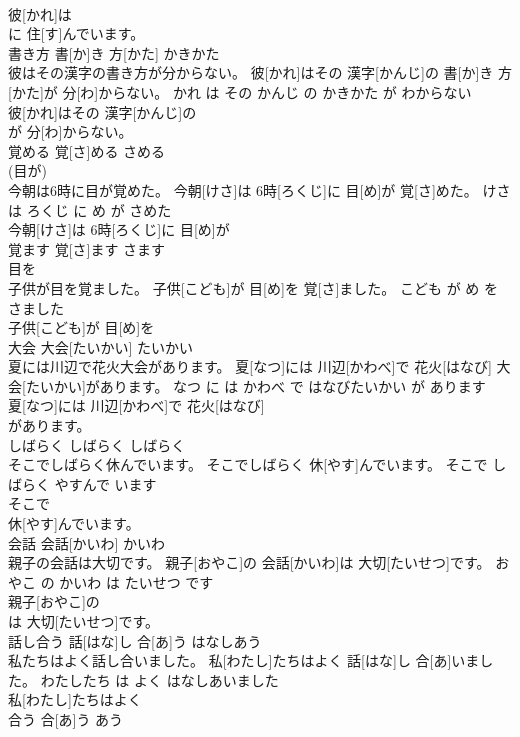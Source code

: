 \documentclass[8pt]{extreport}
\begin{document}
\begin{CJK}{UTF8}{min}
\\	彼[かれ]は
\\	に 住[す]んでいます。		
\\	書き方	書[か]き 方[かた]	かきかた	
\\	彼はその漢字の書き方が分からない。	彼[かれ]はその 漢字[かんじ]の 書[か]き 方[かた]が 分[わ]からない。	かれ は その かんじ の かきかた が わからない	
\\	彼[かれ]はその 漢字[かんじ]の
\\	が 分[わ]からない。		
\\	覚める	覚[さ]める	さめる	
\\	(目が)		
\\	今朝は6時に目が覚めた。	今朝[けさ]は 6時[ろくじ]に 目[め]が 覚[さ]めた。	けさ は ろくじ に め が さめた	
\\	今朝[けさ]は 6時[ろくじ]に 目[め]が
\\	覚ます	覚[さ]ます	さます	
\\	目を		
\\	子供が目を覚ました。	子供[こども]が 目[め]を 覚[さ]ました。	こども が め を さました	
\\	子供[こども]が 目[め]を
\\	大会	大会[たいかい]	たいかい	
\\	夏には川辺で花火大会があります。	夏[なつ]には 川辺[かわべ]で 花火[はなび] 大会[たいかい]があります。	なつ に は かわべ で はなびたいかい が あります	
\\	夏[なつ]には 川辺[かわべ]で 花火[はなび]
\\	があります。		
\\	しばらく	しばらく	しばらく	
\\	そこでしばらく休んでいます。	そこでしばらく 休[やす]んでいます。	そこで しばらく やすんで います	
\\	そこで
\\	休[やす]んでいます。		
\\	会話	会話[かいわ]	かいわ	
\\	親子の会話は大切です。	親子[おやこ]の 会話[かいわ]は 大切[たいせつ]です。	おやこ の かいわ は たいせつ です	
\\	親子[おやこ]の
\\	は 大切[たいせつ]です。		
\\	話し合う	話[はな]し 合[あ]う	はなしあう	
\\	私たちはよく話し合いました。	私[わたし]たちはよく 話[はな]し 合[あ]いました。	わたしたち は よく はなしあいました	
\\	私[わたし]たちはよく
\\	合う	合[あ]う	あう	

\end{CJK}
\end{document}
